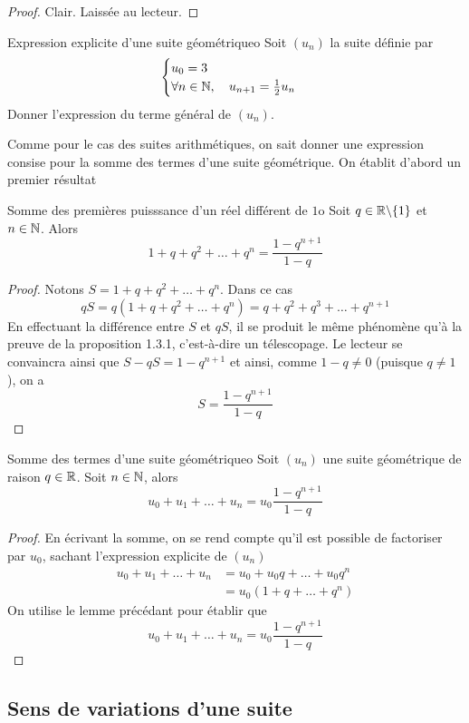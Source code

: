 \begin{proof}
	Clair. Laissée au lecteur.
\end{proof}

\begin{exemple}{Expression explicite d'une suite géométrique}{o}
	Soit $(u_n)$ la suite définie par \[\begin{cases}u_0=3\\\forall n\in\mathbb{N},\quad u_{n+1}=\frac12u_n\end{cases}\]
	Donner l'expression du terme général de $(u_n)$.
\end{exemple}
Comme pour le cas des suites arithmétiques, on sait donner une expression consise pour la somme des termes d'une suite géométrique. On établit d'abord un premier résultat

\begin{lemme}{Somme des premières puisssance d'un réel différent de $1$}{o}
Soit $q\in\mathbb{R}\backslash\lbrace 1\rbrace$ et $n\in\mathbb{N}$. Alors \[1+q+q^2+\dots+q^n=\frac{1-q^{n+1}}{1-q}\]
\end{lemme}

\begin{proof}
Notons $S=1+q+q^2+\dots+q^n$. Dans ce cas
\[qS=q(1+q+q^2+\dots+q^n)=q+q^2+q^3+\dots+q^{n+1}\]
En effectuant la différence entre $S$ et $qS$, il se produit le même phénomène qu'à la preuve de la proposition 1.3.1, c'est-à-dire un télescopage. Le lecteur se convaincra ainsi que $S-qS=1-q^{n+1}$ et ainsi, comme $1-q\neq 0$ (puisque $q\neq 1$), on a \[S=\frac{1-q^{n+1}}{1-q}\]
\end{proof}

\begin{proposition}{Somme des termes d'une suite géométrique}{o}
	Soit $(u_n)$ une suite géométrique de raison $q\in\mathbb{R}$. Soit $n\in\mathbb{N}$, alors \[u_0+u_1+\dots+u_n=u_0\frac{1-q^{n+1}}{1-q}\]
\end{proposition}

\begin{proof}
	En écrivant la somme, on se rend compte qu'il est possible de factoriser par $u_0$, sachant l'expression explicite de $(u_n)$ 
	\begin{align*}
		u_0+u_1+\dots+u_n &= u_0+u_0q+\dots+u_0q^n\\
						  &= u_0(1+q+\dots+q^n)
	\end{align*}
	On utilise le lemme précédant pour établir que \[u_0+u_1+\dots+u_n=u_0\frac{1-q^{n+1}}{1-q}\]
\end{proof}

\subsection{Sens de variations d'une suite}

